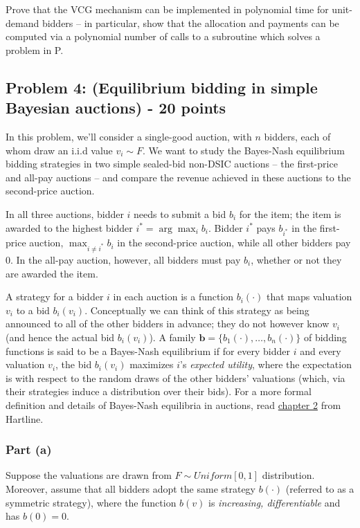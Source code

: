 \documentclass[letterpaper,11pt]{article}
\begin{document}
Prove that the VCG mechanism can be implemented in polynomial time for unit-demand bidders -- in particular, show that the allocation and payments can be computed via a polynomial number of calls to a subroutine which solves a problem in P.




\subsection*{Problem 4: (Equilibrium bidding in simple Bayesian auctions) - 20 points}

In this problem, we'll consider a single-good auction, with $n$ bidders, each of whom draw an i.i.d value $v_i\sim F$. We want to study the Bayes-Nash equilibrium bidding strategies in two simple sealed-bid non-DSIC auctions -- the first-price and all-pay auctions -- and compare the revenue achieved in these auctions to the second-price auction.

In all three auctions, bidder $i$ needs to submit a bid $b_i$ for the item; the item is awarded to the highest bidder $i^*=\arg\max_ib_i$. Bidder $i^*$ pays $b_{i^*}$ in the first-price auction, $\max_{i\neq i^*}b_i$ in the second-price auction, while all other bidders pay $0$. In the all-pay auction, however, all bidders must pay $b_i$, whether or not they are awarded the item.

A strategy for a bidder $i$ in each auction is a function $b_i(\cdot)$ that maps valuation $v_i$ to a bid $b_i(v_i)$. Conceptually we can think of this strategy as being announced to all of the other bidders in advance; they do not however know $v_i$ (and hence the actual bid $b_i(v_i)$). A family $\mathbf{b} = \{b_1(\cdot),\ldots,b_n(\cdot)\}$ of bidding functions is said to be a Bayes-Nash equilibrium if for every bidder $i$ and every valuation $v_i$, the bid $b_i(v_i)$ maximizes $i$’s \emph{expected utility}, where the expectation is with respect to the random draws of the other
bidders' valuations (which, via their strategies induce a distribution over their bids). For a more formal definition and details of Bayes-Nash equilibria in auctions, read \href{http://jasonhartline.com/MDnA/MDnA-ch2.pdf}{chapter 2} from Hartline.

\subsubsection*{Part (a)} 
Suppose the valuations are drawn from $F\sim Uniform[0, 1]$ distribution. Moreover, assume that all bidders adopt the same strategy $b(\cdot)$ (referred to as a symmetric strategy), where the function $b(v)$ is \emph{increasing, differentiable} and has $b(0)=0$.
\end{document}
